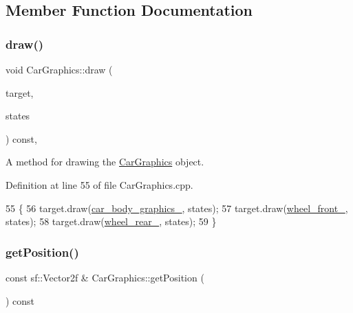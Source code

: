 \subsection{Member Function Documentation}
\mbox{\label{classCarGraphics_a7a9cf695c9bae5a533c21c6f5d78e635}} 
\subsubsection{\texorpdfstring{draw()}{draw()}}
{\footnotesize\ttfamily void Car\+Graphics\+::draw (\begin{DoxyParamCaption}\item[{sf\+::\+Render\+Target \&}]{target,  }\item[{sf\+::\+Render\+States}]{states }\end{DoxyParamCaption}) const\hspace{0.3cm}{\ttfamily [override]}, {\ttfamily [private]}}



A method for drawing the \hyperlink{classCarGraphics}{Car\+Graphics} object. 



Definition at line 55 of file Car\+Graphics.\+cpp.


\begin{DoxyCode}
55                                                                           \{
56     target.draw(\hyperlink{classCarGraphics_a4e1969ef5f4326f10b83b1488484f660}{car\_body\_graphics\_}, states);
57     target.draw(\hyperlink{classCarGraphics_a2e004e7f0288f6ed1352ba9116b4d112}{wheel\_front\_}, states);
58     target.draw(\hyperlink{classCarGraphics_a2a66d0c60b79f54a807a31afd76c4ad1}{wheel\_rear\_}, states);
59 \}
\end{DoxyCode}
\mbox{\label{classCarGraphics_a80e3b77608619843db5cbae4faee825b}} 
\subsubsection{\texorpdfstring{get\+Position()}{getPosition()}}
{\footnotesize\ttfamily const sf\+::\+Vector2f \& Car\+Graphics\+::get\+Position (\begin{DoxyParamCaption}{ }\end{DoxyParamCaption}) const}



